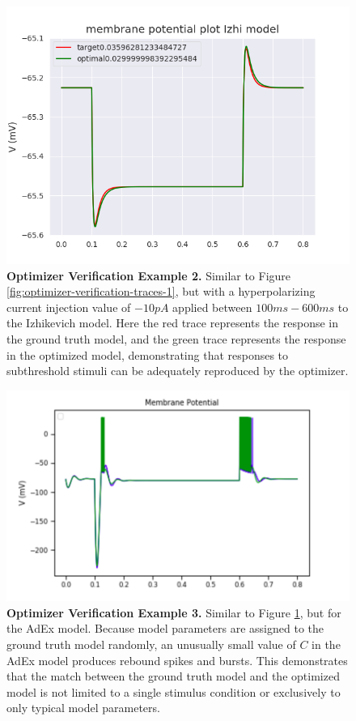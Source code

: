 \begin{figure}
    \centering
    \includegraphics[scale=0.85]{figures/capacitance.png}
    \caption[Optimizer Verification Example 2]{\textbf{Optimizer Verification Example 2.} Similar to Figure
    \ref{fig:optimizer-verification-traces-1}, but with a hyperpolarizing current injection value of $-10pA$ applied between $100ms-600ms$ to the Izhikevich model.
    Here the red trace represents the response in the ground truth model, and the green trace represents the response in the optimized model, demonstrating that responses to subthreshold stimuli can be adequately reproduced by the optimizer.}
    \label{fig:optimizer-verification-traces-2}
\end{figure}

\begin{figure}
    \centering
    \includegraphics[scale=0.85]{figures/simulated_data_sub_threshold.png}
    \caption[Optimizer Verification Example 3]{\textbf{Optimizer Verification Example 3.}
    Similar to Figure
    \ref{fig:optimizer-verification-traces-2}, but for the AdEx model.
    Because model parameters are assigned to the ground truth model randomly, an unusually small value of $C$ in the AdEx model produces rebound spikes and bursts.
    This demonstrates that the match between the ground truth model and the optimized model is not limited to a single stimulus condition or exclusively to only typical model parameters.}
    \label{fig:adexp_model_rebound_spike}
\end{figure}

